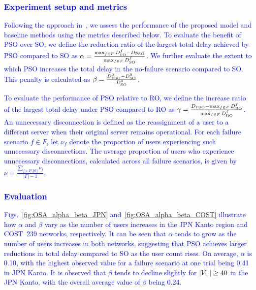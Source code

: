 \documentclass[10pt, letterpaper]{IEEEtran}
\newcommand\blue[1]{\textcolor{blue}{#1}}
\begin{document}
\begin{CJK}{UTF8}{ipxm}
\subsubsection{\blue{Experiment setup and metrics}}
\blue{
Following the approach in~\cite{5_9_13_Kamrul2010, 5_9_Masuda2020}, we assess the performance of the proposed model and baseline methods using the metrics described below.
To evaluate the benefit of PSO over SO, we define the reduction ratio of the largest total delay achieved by PSO compared to SO as
$\alpha = \frac{\max_{f \in F}D^f_{\rm SO} - D_{\rm PSO}}{\max_{f \in F}D^f_{\rm SO}}$.
We further evaluate the extent to which PSO increases the total delay in the no-failure scenario compared to SO. This penalty is calculated as
$\beta = \frac{D^0_{\rm PSO} - D^0_{\rm SO}}{D^0_{\rm SO}}$.
}

\blue{
To evaluate the performance of PSO relative to RO, we define the increase ratio of the largest total delay under PSO compared to RO as
$\gamma = \frac{D_{\rm PSO} - \max_{f \in F}D^f_{\rm RO}}{\max_{f \in F}D^f_{\rm RO}}$.
An unnecessary disconnection is defined as the reassignment of a user to a different server when their original server remains operational.
For each failure scenario $f \in F$, let $\nu_f$ denote the proportion of users experiencing such unnecessary disconnections.
The average proportion of users who experience unnecessary disconnections, calculated across all failure scenarios, is given by
$\nu = \frac{\sum_{f \in F \setminus \{0\}}\nu_f}{|F| - 1}$.
}

\subsubsection{\blue{Evaluation}}
\blue{
Figs.~\ref{fig:OSA_alpha_beta_JPN} and~\ref{fig:OSA_alpha_beta_COST} illustrate how $\alpha$ and $\beta$ vary as the number of users increases in the JPN Kanto region and COST~239 networks, respectively.
It can be seen that $\alpha$ tends to grow as the number of users increases in both networks, suggesting that PSO achieves larger reductions in total delay compared to SO as the user count rises.
On average, $\alpha$ is 0.10, with the highest observed value for a failure scenario at one trial being 0.41 in JPN Kanto.
It is observed that $\beta$ tends to decline slightly for $|V_{\rm U}| \geq 40$ in the JPN Kanto, with the overall average value of $\beta$ being 0.24.
}


\end{CJK}
\end{document}
